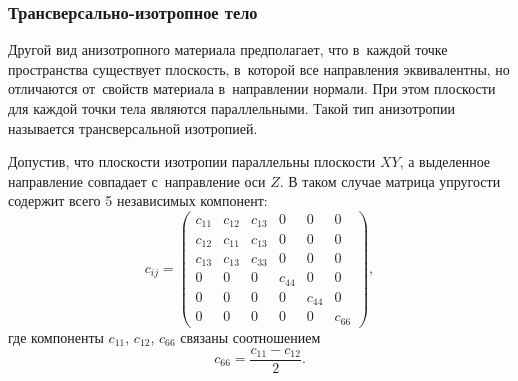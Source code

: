 \documentclass[thesis.tex]{subfiles}
\begin{document}
\subsubsection{Трансверсально-изотропное тело}

Другой вид анизотропного материала предполагает, что в~каждой точке пространства существует плоскость, в~которой все
направления эквивалентны, но отличаются от~свойств материала в~направлении нормали. При этом плоскости для каждой точки
тела являются параллельными. Такой тип анизотропии называется трансверсальной изотропией.

Допустив, что плоскости изотропии параллельны плоскости $XY$, а выделенное направление совпадает с~направление оси $Z$.
В таком случае матрица упругости содержит всего 5 независимых компонент:
\[
    c_{ij} = \begin{pmatrix}
    c_{11} & c_{12} & c_{13} & 0 & 0 & 0 \\
    c_{12} & c_{11} & c_{13} & 0 & 0 & 0 \\
    c_{13} & c_{13} & c_{33} & 0 & 0 & 0 \\
    0 & 0 & 0 & c_{44} & 0 & 0 \\
    0 & 0 & 0 & 0 & c_{44} & 0 \\
    0 & 0 & 0 & 0 & 0 & c_{66}
    \end{pmatrix},
\]
где компоненты $c_{11}$, $c_{12}$, $c_{66}$ связаны соотношением
\[
    c_{66} = \frac{c_{11} - c_{12}}{2}.
\]
\end{document}
